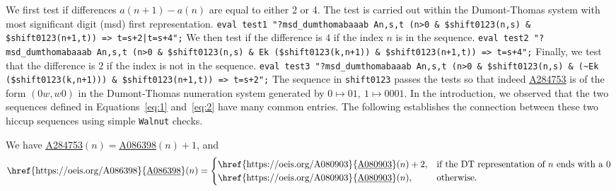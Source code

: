 \documentclass[12pt,reqno]{article}
\newcommand{\seqnum}[1]{\href{https://oeis.org/#1}{\rm \underline{#1}}}
\begin{document}
We first test if differences $a(n+1)-a(n)$ are equal to either 2 or 4. The test is carried
out within the Dumont-Thomas system with most significant digit (msd) first representation.
\smallbreak 
\noindent\texttt{eval test1 "?msd\_dumthomabaaab An,s,t (n>0 \& \$shift0123(n,s) \&
\newline \$shift0123(n+1,t)) => t=s+2|t=s+4";}
\smallbreak 
\noindent
We then test if the difference is $4$ if the index $n$ is in the sequence.
\smallbreak
\noindent\texttt{eval test2 "?msd\_dumthomabaaab An,s,t (n>0 \& \$shift0123(n,s) \& \newline Ek (\$shift0123(k,n+1)) \& \$shift0123(n+1,t)) => t=s+4";}
\smallbreak 
\noindent
Finally, we test that the difference is $2$ if the index is not in the sequence.
\smallbreak\noindent\texttt{eval test3 "?msd\_dumthomabaaab An,s,t (n>0 \& \$shift0123(n,s) \& \newline
(\~{}Ek (\$shift0123(k,n+1))) \& \$shift0123(n+1,t)) => t=s+2";}
\smallbreak 
\noindent
The sequence in \texttt{shift0123} passes the tests so that indeed 
\seqnum{A284753} is of the form $(0w,w0)$ in the Dumont-Thomas numeration system
generated by $0\mapsto 01,\ 1\mapsto 0001$.
\medbreak
In the introduction, we observed that the two sequences defined 
in Equations~\ref{eq:1} and~\ref{eq:2} have many common entries.
The following establishes the connection between these two hiccup sequences using simple \texttt{Walnut} checks.
\begin{lemma}
    We have \seqnum{A284753}$(n)=$\seqnum{A086398}$(n)+1$, and
    \begin{equation*}
        \text{\seqnum{A086398}}(n)=\begin{cases}
        \text{\seqnum{A080903}}(n)+2,&\text{if the DT representation
of $n$ ends with a $0$}\\
        \text{\seqnum{A080903}}(n), &\text{otherwise.}
    \end{cases}
    \end{equation*}
\end{lemma}
\end{document}

